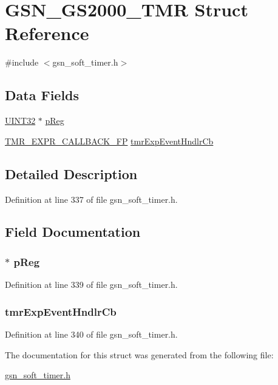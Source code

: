 \hypertarget{a00084}{
\section{GSN\_\-GS2000\_\-TMR Struct Reference}
\label{a00084}
}


{\ttfamily \#include $<$gsn\_\-soft\_\-timer.h$>$}

\subsection*{Data Fields}
\begin{DoxyCompactItemize}
\item 
\hyperlink{a00660_gae1e6edbbc26d6fbc71a90190d0266018}{UINT32} $\ast$ \hyperlink{a00084_a8843236297383a79c5da2bbddfcee223}{pReg}
\item 
\hyperlink{a00586_a108e60c810cf3cd77f8efec30a64360c}{TMR\_\-EXPR\_\-CALLBACK\_\-FP} \hyperlink{a00084_af881e6f8dee6eaca97d4913d46952077}{tmrExpEventHndlrCb}
\end{DoxyCompactItemize}


\subsection{Detailed Description}


Definition at line 337 of file gsn\_\-soft\_\-timer.h.



\subsection{Field Documentation}
\hypertarget{a00084_a8843236297383a79c5da2bbddfcee223}{
\subsubsection[{pReg}]{$\ast$ {\bf pReg}}}
\label{a00084_a8843236297383a79c5da2bbddfcee223}


Definition at line 339 of file gsn\_\-soft\_\-timer.h.

\hypertarget{a00084_af881e6f8dee6eaca97d4913d46952077}{
\subsubsection[{tmrExpEventHndlrCb}]{ {\bf tmrExpEventHndlrCb}}}
\label{a00084_af881e6f8dee6eaca97d4913d46952077}


Definition at line 340 of file gsn\_\-soft\_\-timer.h.



The documentation for this struct was generated from the following file:\begin{DoxyCompactItemize}
\item 
\hyperlink{a00586}{gsn\_\-soft\_\-timer.h}\end{DoxyCompactItemize}
